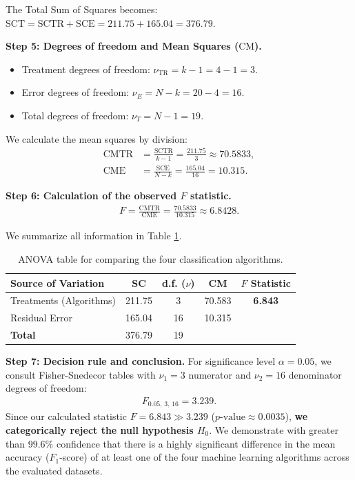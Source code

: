 \begin{solproblema}
	The Total Sum of Squares becomes: $\text{SCT} = \text{SCTR} + \text{SCE} = 211.75 + 165.04 = 376.79$.
	
	\textbf{Step 5: Degrees of freedom and Mean Squares ($\text{CM}$).}
	\begin{itemize}
		\item Treatment degrees of freedom: $\nu_{\text{TR}} = k - 1 = 4 - 1 = 3$.
		\item Error degrees of freedom: $\nu_E = N - k = 20 - 4 = 16$.
		\item Total degrees of freedom: $\nu_T = N - 1 = 19$.
	\end{itemize}
	We calculate the mean squares by division:
	\begin{align}
		\text{CMTR} &= \frac{\text{SCTR}}{k - 1} = \frac{211.75}{3} \approx 70.5833, \\
		\text{CME} &= \frac{\text{SCE}}{N - k} = \frac{165.04}{16} = 10.315.
	\end{align}
	
	\textbf{Step 6: Calculation of the observed $F$ statistic.}
	\begin{align}
		F = \frac{\text{CMTR}}{\text{CME}} = \frac{70.5833}{10.315} \approx 6.8428.
	\end{align}
	
	We summarize all information in Table \ref{tab:anova_sol_1}.
	\begin{table}[h!]
		\centering
		\begin{tabular}{lcccc}
			\hline
			\textbf{Source of Variation} & \textbf{SC} & \textbf{d.f. ($\nu$)} & \textbf{CM} & \textbf{$F$ Statistic} \\ \hline
			Treatments (Algorithms) & 211.75 & 3 & 70.583 & \textbf{6.843} \\
			Residual Error & 165.04 & 16 & 10.315 & \\ \hline
			\textbf{Total} & 376.79 & 19 & & \\ \hline
		\end{tabular}
		\caption{ANOVA table for comparing the four classification algorithms.}
		\label{tab:anova_sol_1}
	\end{table}
	
	\textbf{Step 7: Decision rule and conclusion.}
	For significance level $\alpha = 0.05$, we consult Fisher-Snedecor tables with $\nu_1 = 3$ numerator and $\nu_2 = 16$ denominator degrees of freedom:
	\begin{align}
		F_{0.05, \, 3, \, 16} = 3.239.
	\end{align}
	Since our calculated statistic $F = 6.843 \gg 3.239$ ($p\text{-value} \approx 0.0035$), \textbf{we categorically reject the null hypothesis $H_0$}. We demonstrate with greater than $99.6\%$ confidence that there is a highly significant difference in the mean accuracy ($F_1$-score) of at least one of the four machine learning algorithms across the evaluated datasets.
\end{solproblema}

